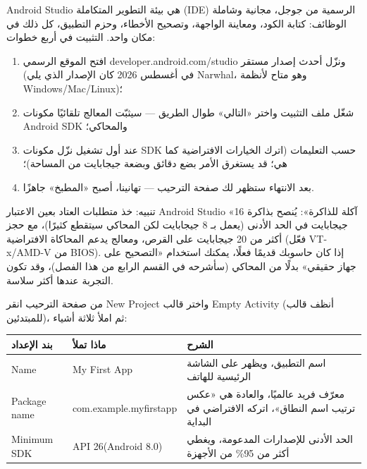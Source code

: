 


Android Studio هي بيئة التطوير المتكاملة (IDE) الرسمية من جوجل، مجانية وشاملة الوظائف: كتابة الكود، ومعاينة الواجهة، وتصحيح الأخطاء، وحزم التطبيق، كل ذلك في مكان واحد. التثبيت في أربع خطوات:

\begin{enumerate}
  \item افتح الموقع الرسمي developer.android.com/studio ونزّل أحدث إصدار مستقر (في أغسطس 2026 كان الإصدار الذي يلي Narwhal، وهو متاح لأنظمة Windows/Mac/Linux)؛
  \item شغّل ملف التثبيت واختر «التالي» طوال الطريق — سيثبّت المعالج تلقائيًا مكونات Android SDK والمحاكي؛
  \item عند أول تشغيل نزّل مكونات SDK حسب التعليمات (اترك الخيارات الافتراضية كما هي؛ قد يستغرق الأمر بضع دقائق وبضعة جيجابايت من المساحة)؛
  \item بعد الانتهاء ستظهر لك صفحة الترحيب — تهانينا، أصبح «المطبخ» جاهزًا.
\end{enumerate}

\begin{tcbwarn}{تنبيه: خذ متطلبات العتاد بعين الاعتبار}
Android Studio «آكلة للذاكرة»: يُنصح بذاكرة 16 جيجابايت في الحد الأدنى (يعمل بـ 8 جيجابايت لكن المحاكي سيتقطع كثيرًا)، مع حجز أكثر من 20 جيجابايت على القرص، ومعالج يدعم المحاكاة الافتراضية (فعّل VT-x/AMD-V من BIOS). إذا كان حاسوبك قديمًا فعلًا، يمكنك استخدام «التصحيح على جهاز حقيقي» بدلًا من المحاكي (سأشرحه في القسم الرابع من هذا الفصل)، وقد تكون التجربة عندها أكثر سلاسة.

\end{tcbwarn}


من صفحة الترحيب انقر New Project واختر قالب Empty Activity (أنظف قالب للمبتدئين)، ثم املأ ثلاثة أشياء:

\begin{center}
\begin{tabularx}{\linewidth}{|X|X|X|}
\hline
\textbf{بند الإعداد} & \textbf{ماذا تملأ} & \textbf{الشرح} \tabularnewline
\hline
Name & My First App & اسم التطبيق، ويظهر على الشاشة الرئيسية للهاتف \tabularnewline
Package name & com.example.myfirstapp & معرّف فريد عالميًا، والعادة هي «عكس ترتيب اسم النطاق»، اتركه الافتراضي في البداية \tabularnewline
Minimum SDK & API 26(Android 8.0) & الحد الأدنى للإصدارات المدعومة، ويغطي أكثر من 95\% من الأجهزة \tabularnewline
\hline
\end{tabularx}
\end{center}

